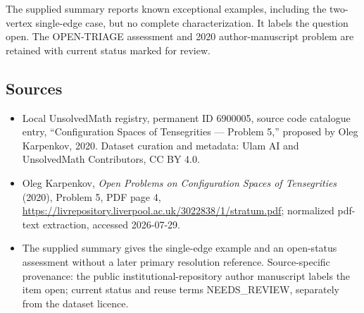 \documentclass[11pt]{article}
\begin{document}
The supplied summary reports known exceptional examples, including the two-vertex single-edge case, but no complete characterization. It labels the question open. The OPEN-TRIAGE assessment and 2020 author-manuscript problem are retained with current status marked for review.
\subsection{Sources}
\begin{itemize}
\item Local UnsolvedMath registry, permanent ID 6900005, source code catalogue entry, ``Configuration Spaces of Tensegrities --- Problem 5,'' proposed by Oleg Karpenkov, 2020. Dataset curation and metadata: Ulam AI and UnsolvedMath Contributors, CC BY 4.0.
\item Oleg Karpenkov, \emph{Open Problems on Configuration Spaces of Tensegrities} (2020), Problem 5, PDF page 4, \url{https://livrepository.liverpool.ac.uk/3022838/1/stratum.pdf}; normalized pdf-text extraction, accessed 2026-07-29.
\item The supplied summary gives the single-edge example and an open-status assessment without a later primary resolution reference. Source-specific provenance: the public institutional-repository author manuscript labels the item open; current status and reuse terms NEEDS\_REVIEW, separately from the dataset licence.
\end{itemize}
\end{document}
